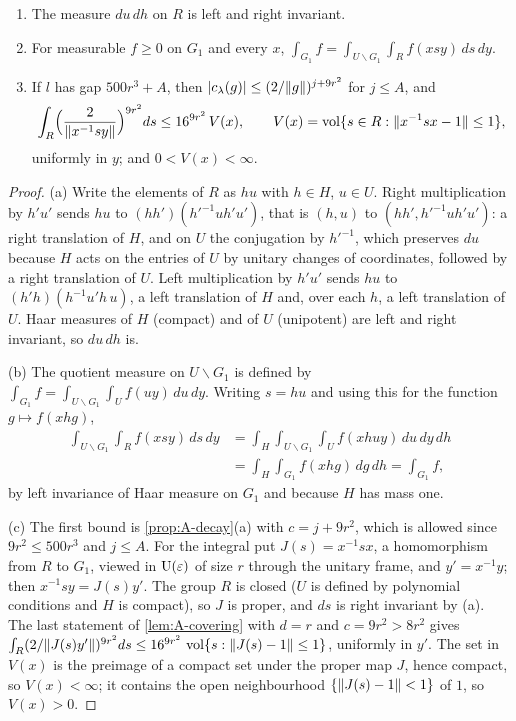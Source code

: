 \begin{lemma}\label{lem:bessel-group}
\begin{enumerate}[label=\textup{(\alph*)}]
\item The measure $du\,dh$ on $R$ is left and right invariant.
\item For measurable $f\ge0$ on $G_1$ and every $x$, $\int_{G_1}f=\int_{U\backslash G_1}\int_Rf(xsy)\,ds\,dy$.
\item If $l$ has gap $500r^3+A$, then $\lvert c_\lambda(g)\rvert\le(2/\lVert g\rVert)^{j+9r^2}$ for $j\le A$, and
\[
  \int_R\Bigl(\frac2{\lVert x^{-1}sy\rVert}\Bigr)^{9r^2}ds\le16^{9r^2}\,V(x),\qquad V(x)=\operatorname{vol}\{s\in R:\lVert x^{-1}sx-1\rVert\le1\},
\]
uniformly in $y$; and $0<V(x)<\infty$.
\end{enumerate}
\end{lemma}

\begin{proof}
(a) Write the elements of $R$ as $hu$ with $h\in H$, $u\in U$. Right multiplication by $h'u'$ sends $hu$ to $(hh')(h'^{-1}uh'u')$, that is $(h,u)$ to $(hh',h'^{-1}uh'u')$: a right translation of $H$, and on $U$ the conjugation by $h'^{-1}$,
which preserves $du$ because $H$ acts on the entries of $U$ by unitary changes of coordinates, followed by a right translation of $U$. Left multiplication by $h'u'$ sends $hu$ to $(h'h)(h^{-1}u'h\,u)$, a left translation of $H$ and, over
each $h$, a left translation of $U$. Haar measures of $H$ (compact) and of $U$ (unipotent) are left and right invariant, so $du\,dh$ is.

(b) The quotient measure on $U\backslash G_1$ is defined by $\int_{G_1}f=\int_{U\backslash G_1}\int_Uf(uy)\,du\,dy$. Writing $s=hu$ and using this for the function $g\mapsto f(xhg)$,
\begin{align*}
  \int_{U\backslash G_1}\int_Rf(xsy)\,ds\,dy&=\int_H\int_{U\backslash G_1}\int_Uf(xhuy)\,du\,dy\,dh\\
  &=\int_H\int_{G_1}f(xhg)\,dg\,dh=\int_{G_1}f,
\end{align*}
by left invariance of Haar measure on $G_1$ and because $H$ has mass one.

(c) The first bound is \cref{prop:A-decay}(a) with $c=j+9r^2$, which is allowed since $9r^2\le500r^3$ and $j\le A$. For the integral put $J(s)=x^{-1}sx$, a homomorphism from $R$ to $G_1$, viewed in $\operatorname{U}(\varepsilon)$ of size $r$
through the unitary frame, and $y'=x^{-1}y$; then $x^{-1}sy=J(s)y'$. The group $R$ is closed ($U$ is defined by polynomial conditions and $H$ is compact), so $J$ is proper, and $ds$ is right invariant by (a). The last statement of
\cref{lem:A-covering} with $d=r$ and $c=9r^2>8r^2$ gives $\int_R(2/\lVert J(s)y'\rVert)^{9r^2}ds\le16^{9r^2}\,\operatorname{vol}\{s:\lVert J(s)-1\rVert\le1\}$, uniformly in $y'$. The set in $V(x)$ is the preimage of a compact set under the
proper map $J$, hence compact, so $V(x)<\infty$; it contains the open neighbourhood $\{\lVert J(s)-1\rVert<1\}$ of $1$, so $V(x)>0$.
\end{proof}

